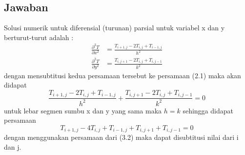 \documentclass[a4paper,12pt]{article}
\numberwithin{equation}{section} %
\begin{document}
\subsection{Jawaban}
Solusi numerik untuk diferensial (turunan) parsial untuk variabel x dan y berturut-turut adalah :
\begin{align*}
\frac{\partial^2 T}{\partial x^2} &= \frac{T_{i+1,j}-2T_{i,j}+T_{i-1,j}}{h^2}\\ 
\frac{\partial^2 T}{\partial y^2} &= \frac{T_{i,j+1}-2T_{i,j}+T_{i,j-1}}{k^2}
\end{align*}
dengan mensubtitusi kedua persamaan tersebut ke persamaan (2.1) maka akan didapat
$$\frac{T_{i+1,j}-2T_{i,j}+T_{i-1,j}}{h^2} + \frac{T_{i,j+1}-2T_{i,j}+T_{i,j-1}}{k^2} = 0$$
untuk lebar segmen sumbu x dan y yang sama maka $h=k$ sehingga didapat persamaan
\begin{equation}
T_{i+1,j} - 4T_{i,j} + T_{i-1,j} + T_{i,j+1} + T_{i,j-1} = 0
\end{equation}
dengan menggunakan persamaan dari (3.2) maka dapat disubtitusi nilai dari i dan j.
\end{document}
